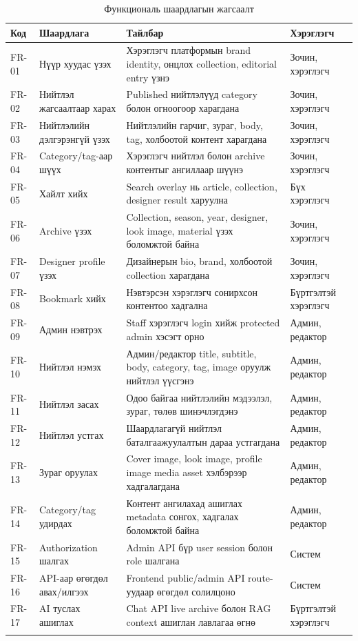 {\small
\begin{longtable}{|L{0.07\textwidth}|L{0.24\textwidth}|L{0.35\textwidth}|L{0.16\textwidth}|}
  \hline
  \textbf{Код} & \textbf{Шаардлага} & \textbf{Тайлбар} & \textbf{Хэрэглэгч} \\ \hline
  FR-01 & Нүүр хуудас үзэх & Хэрэглэгч платформын brand identity, онцлох collection, editorial entry үзнэ & Зочин, хэрэглэгч \\ \hline
  FR-02 & Нийтлэл жагсаалтаар харах & Published нийтлэлүүд category болон огноогоор харагдана & Зочин, хэрэглэгч \\ \hline
  FR-03 & Нийтлэлийн дэлгэрэнгүй үзэх & Нийтлэлийн гарчиг, зураг, body, tag, холбоотой контент харагдана & Зочин, хэрэглэгч \\ \hline
  FR-04 & Category/tag-аар шүүх & Хэрэглэгч нийтлэл болон archive контентыг ангиллаар шүүнэ & Зочин, хэрэглэгч \\ \hline
  FR-05 & Хайлт хийх & Search overlay нь article, collection, designer result харуулна & Бүх хэрэглэгч \\ \hline
  FR-06 & Archive үзэх & Collection, season, year, designer, look image, material үзэх боломжтой байна & Зочин, хэрэглэгч \\ \hline
  FR-07 & Designer profile үзэх & Дизайнерын bio, brand, холбоотой collection харагдана & Зочин, хэрэглэгч \\ \hline
  FR-08 & Bookmark хийх & Нэвтэрсэн хэрэглэгч сонирхсон контентоо хадгална & Бүртгэлтэй хэрэглэгч \\ \hline
  FR-09 & Админ нэвтрэх & Staff хэрэглэгч login хийж protected admin хэсэгт орно & Админ, редактор \\ \hline
  FR-10 & Нийтлэл нэмэх & Админ/редактор title, subtitle, body, category, tag, image оруулж нийтлэл үүсгэнэ & Админ, редактор \\ \hline
  FR-11 & Нийтлэл засах & Одоо байгаа нийтлэлийн мэдээлэл, зураг, төлөв шинэчлэгдэнэ & Админ, редактор \\ \hline
  FR-12 & Нийтлэл устгах & Шаардлагагүй нийтлэл баталгаажуулалтын дараа устгагдана & Админ, редактор \\ \hline
  FR-13 & Зураг оруулах & Cover image, look image, profile image media asset хэлбэрээр хадгалагдана & Админ, редактор \\ \hline
  FR-14 & Category/tag удирдах & Контент ангилахад ашиглах metadata сонгох, хадгалах боломжтой байна & Админ, редактор \\ \hline
  FR-15 & Authorization шалгах & Admin API бүр user session болон role шалгана & Систем \\ \hline
  FR-16 & API-аар өгөгдөл авах/илгээх & Frontend public/admin API route-уудаар өгөгдөл солилцоно & Систем \\ \hline
  FR-17 & AI туслах ашиглах & Chat API live archive болон RAG context ашиглан лавлагаа өгнө & Бүртгэлтэй хэрэглэгч \\ \hline
  \caption{Функциональ шаардлагын жагсаалт}
  \label{tab:functional-requirements-ch2}\\
\end{longtable}
}

